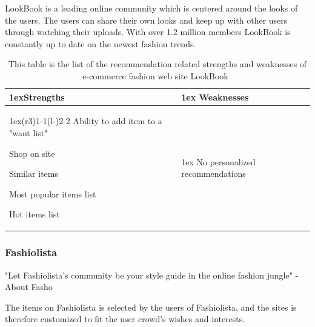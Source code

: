     LookBook is a leading online community which is centered around the looks of the users.
    The users can share their own looks and keep up with other users through watching their uploads.
    With over 1.2 million members LookBook is constantly up to date on the newest fashion trends.
    \begin{table}[H]
                \centering
                \begin{tabularx}{\linewidth}{>{\parskip1ex}X@{\kern4\tabcolsep}>{\parskip1ex}X}
                \toprule
                \hfil\bfseries Strengths
                &
                \hfil\bfseries Weaknesses
                \\\cmidrule(r{3\tabcolsep}){1-1}\cmidrule(l{-\tabcolsep}){2-2}
                Ability to add item to a "want list" \par
                Shop on site \par
                Similar items \par
                Most popular items list \par
                Hot items list \par
                &
                No personalized recommendations \par
                \\ \bottomrule
        \end{tabularx}
        \caption[Recommendation related strengths and weaknesses of LookBook~\cite{LookBook}]{This table is the list of the recommendation related strengths and weaknesses of e-commerce fashion web site LookBook~\cite{LookBook}}
        \label{table:ecommenreceLookBook}
    \end{table}


\subsubsection{Fashiolista} %
\label{par:fashiolista}
    "Let Fashiolista's community be your style guide in the online fashion jungle" - About Fasho~\cite{Fashiolista}

    The items on Fashiolista is selected by the users of Fashiolista, and the sites is therefore customized to fit the user crowd's wishes and interests.

